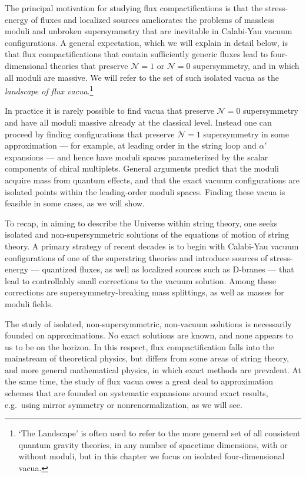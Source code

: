 \documentclass[12pt,a4wide]{article}
\begin{document}
The principal motivation for studying flux compactifications is that the stress-energy of fluxes and localized sources ameliorates the problems of massless moduli and unbroken supersymmetry that are inevitable in Calabi-Yau vacuum configurations.  
A general expectation, which we will explain in detail below, is that flux compactifications that contain sufficiently generic fluxes lead to four-dimensional theories that preserve $\mathcal{N}=1$ or $\mathcal{N}=0$ supersymmetry, and in which all moduli are massive.
We will refer to the set of such isolated vacua as the \emph{landscape of flux vacua}.\footnote{`The Landscape' is often used to refer to the more general set of all consistent quantum gravity theories, in any number of spacetime dimensions, with or without moduli, but in this chapter we focus on isolated four-dimensional vacua.}

In practice it is rarely possible to find vacua that preserve $\mathcal{N}=0$ supersymmetry and have all moduli massive already at the classical level.  Instead one can proceed by finding configurations that preserve $\mathcal{N}=1$ supersymmetry in some approximation --- for example, at leading order in the string loop and $\alpha'$ expansions --- and hence have moduli spaces parameterized by the scalar components of chiral multiplets.  General arguments predict that the moduli acquire mass from quantum effects, and that the exact vacuum configurations are isolated points within the leading-order moduli spaces.  Finding these vacua is feasible in some cases, as we will show.    

To recap, in aiming to describe the Universe within string theory, one seeks isolated and non-supersymmetric solutions of the equations of motion of string theory.  
A primary strategy of recent decades is to begin with Calabi-Yau vacuum configurations of one of the superstring theories and introduce sources of stress-energy --- quantized fluxes, as well as localized sources such as D-branes --- that lead to controllably small corrections to the vacuum solution.  Among these corrections are supersymmetry-breaking mass splittings, as well as masses for moduli fields.

The study of isolated, non-supersymmetric, non-vacuum solutions is necessarily founded on approximations.  No exact solutions are known, and none appears to us to be on the horizon.
In this respect, flux compactification falls into the mainstream of theoretical physics, but differs from some areas of string theory, and more general mathematical physics, in which exact methods are prevalent.  At the same time, the study of flux vacua owes a great deal to approximation schemes that are founded on systematic expansions around exact results, e.g.~using mirror symmetry or nonrenormalization, as we will see.
 
\end{document}
